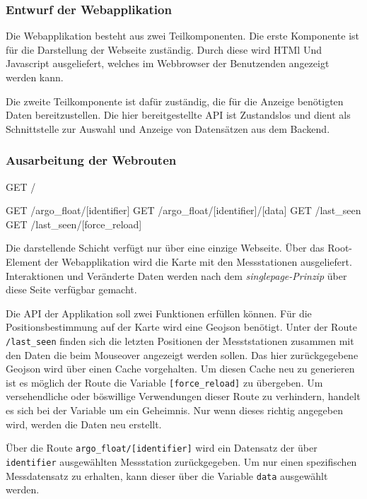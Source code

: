 \subsubsection{Entwurf der Webapplikation}

Die Webapplikation besteht aus zwei Teilkomponenten. Die erste Komponente ist für die Darstellung der Webseite zuständig. Durch diese wird HTMl Und Javascript ausgeliefert, welches im Webbrowser der Benutzenden angezeigt werden kann.

Die zweite Teilkomponente ist dafür zuständig, die für die Anzeige benötigten Daten bereitzustellen. Die hier bereitgestellte API ist Zustandslos und dient als Schnittstelle zur Auswahl und Anzeige von Datensätzen aus dem Backend. 

\subsubsection{Ausarbeitung der Webrouten}

\begin{python}
GET     /

GET     /argo_float/[identifier]
GET     /argo_float/[identifier]/[data]
GET     /last_seen
GET     /last_seen/[force_reload]
\end{python}


Die darstellende Schicht verfügt nur über eine einzige Webseite. Über das Root-Element der Webapplikation wird die Karte mit den Messstationen ausgeliefert. Interaktionen und Veränderte Daten werden nach dem \textit{singlepage-Prinzip} über diese Seite verfügbar gemacht.

Die API der Applikation soll zwei Funktionen erfüllen können. Für die Positionsbestimmung auf der Karte wird eine Geojson benötigt. Unter der Route \texttt{/last\_seen} finden sich die letzten Positionen der Mesststationen zusammen mit den Daten die beim Mouseover angezeigt werden sollen. Das hier zurückgegebene Geojson wird über einen Cache vorgehalten. Um diesen Cache neu zu generieren ist es möglich der Route die Variable \texttt{[force\_reload]} zu übergeben. Um versehendliche oder böswillige Verwendungen dieser Route zu verhindern, handelt es sich bei der Variable um ein Geheimnis. Nur wenn dieses richtig angegeben wird, werden die Daten neu erstellt.

Über die Route \texttt{argo\_float/[identifier]} wird ein Datensatz der über \texttt{identifier} ausgewählten Messstation zurückgegeben. Um nur einen spezifischen Messdatensatz zu erhalten, kann dieser über die Variable \texttt{data} ausgewählt werden. \\


